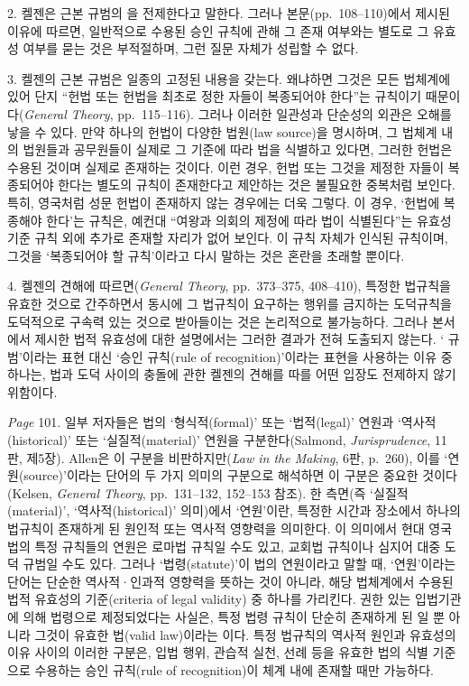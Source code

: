 { 2. 켈젠은 근본 규범의 을 전제한다고 말한다. 그러나
본문(pp.~108--110)에서 제시된 이유에 따르면, 일반적으로 수용된 승인
규칙에 관해 그 존재 여부와는 별도로 그 유효성 여부를 묻는 것은
부적절하며, 그런 질문 자체가 성립할 수 없다.

 3. 켈젠의 근본 규범은 일종의 고정된 내용을 갖는다. 왜냐하면 그것은 모든
법체계에 있어 단지 ``헌법 또는 헌법을 최초로 정한 자들이 복종되어야
한다''는 규칙이기 때문이다(\emph{General Theory}, pp.~115--116).
그러나 이러한 일관성과 단순성의 외관은 오해를 낳을 수 있다. 만약
하나의 헌법이 다양한 법원(law source)을 명시하며, 그 법체계 내의
법원들과 공무원들이 실제로 그 기준에 따라 법을 식별하고 있다면, 그러한
헌법은 수용된 것이며 실제로 존재하는 것이다. 이런 경우, 헌법 또는
그것을 제정한 자들이 복종되어야 한다는 별도의 규칙이 존재한다고
제안하는 것은 불필요한 중복처럼 보인다. 특히, 영국처럼 성문 헌법이
존재하지 않는 경우에는 더욱 그렇다. 이 경우, `헌법에 복종해야 한다'는
규칙은, 예컨대 ``여왕과 의회의 제정에 따라 법이 식별된다''는 유효성
기준 규칙 외에 추가로 존재할 자리가 없어 보인다. 이 규칙 자체가 인식된
규칙이며, 그것을 `복종되어야 할 규칙'이라고 다시 말하는 것은 혼란을
초래할 뿐이다.

 4. 켈젠의 견해에 따르면(\emph{General Theory}, pp.~373--375, 408--410),
특정한 법규칙을 유효한 것으로 간주하면서 동시에 그 법규칙이 요구하는
행위를 금지하는 도덕규칙을 도덕적으로 구속력 있는 것으로 받아들이는
것은 논리적으로 불가능하다. 그러나 본서에서 제시한 법적 유효성에 대한
설명에서는 그러한 결과가 전혀 도출되지 않는다. `
규범'이라는 표현 대신 `승인 규칙(rule of recognition)'이라는 표현을
사용하는 이유 중 하나는, 법과 도덕 사이의 충돌에 관한 켈젠의 견해를
따를 어떤 입장도 전제하지 않기 위함이다.

\emph{Page} 101.  일부 저자들은 법의
`형식적(formal)' 또는 `법적(legal)' 연원과 `역사적(historical)' 또는
`실질적(material)' 연원을 구분한다(Salmond, \emph{Jurisprudence}, 11판,
제5장). Allen은 이 구분을 비판하지만(\emph{Law in the Making}, 6판,
p.~260), 이를 `연원(source)'이라는 단어의 두 가지 의미의 구분으로
해석하면 이 구분은 중요한 것이다(Kelsen, \emph{General Theory},
pp.~131--132, 152--153 참조). 한 측면(즉 `실질적(material)',
`역사적(historical)' 의미)에서 `연원'이란, 특정한 시간과 장소에서 하나의
법규칙이 존재하게 된 원인적 또는 역사적 영향력을 의미한다. 이 의미에서
현대 영국법의 특정 규칙들의 연원은 로마법 규칙일 수도 있고, 교회법
규칙이나 심지어 대중 도덕 규범일 수도 있다. 그러나 `법령(statute)'이
법의 연원이라고 말할 때, `연원'이라는 단어는 단순한 역사적·인과적
영향력을 뜻하는 것이 아니라, 해당 법체계에서 수용된 법적 유효성의
기준(criteria of legal validity) 중 하나를 가리킨다. 권한 있는
입법기관에 의해 법령으로 제정되었다는 사실은, 특정 법령 규칙이 단순히
존재하게 된 일 뿐 아니라 그것이 유효한 법(valid
law)이라는 이다. 특정 법규칙의 역사적 원인과 유효성의
이유 사이의 이러한 구분은, 입법 행위, 관습적 실천, 선례 등을 유효한 법의
식별 기준으로 수용하는 승인 규칙(rule of recognition)이 체계 내에 존재할
때만 가능하다.

}
